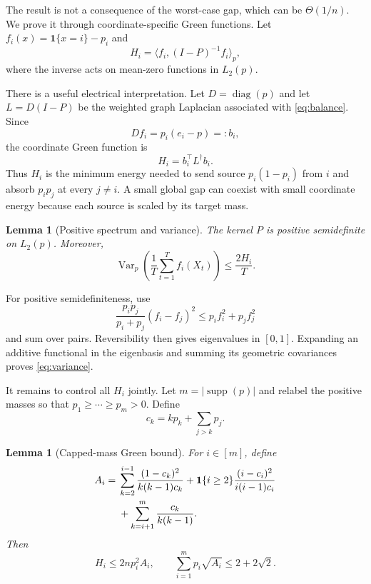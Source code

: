 \documentclass[twoside]{article}
\newtheorem{lemma}[theorem]{Lemma}
\newcommand{\one}{\mathbf 1}
\newcommand{\diag}{\operatorname{diag}}
\newcommand{\supp}{\operatorname{supp}}
\newcommand{\ip}[2]{\langle #1,#2\rangle}
\begin{document}
The result is not a consequence of the worst-case gap, which can be $\Theta(1/n)$. We prove it through coordinate-specific Green functions. Let $f_i(x)=\one\{x=i\}-p_i$ and
\begin{equation}
 H_i=\ip{f_i}{(I-P)^{-1}f_i}_{p},
 \label{eq:green}
\end{equation}
where the inverse acts on mean-zero functions in $L_2(p)$.

There is a useful electrical interpretation. Let $D=\diag(p)$ and let $L=D(I-P)$ be the weighted graph Laplacian associated with \eqref{eq:balance}. Since \[ Df_i=p_i(e_i-p)=:b_i, \] the coordinate Green function is
\begin{equation}
 H_i=b_i^\top L^\dagger b_i.
 \label{eq:electrical}
\end{equation}
Thus $H_i$ is the minimum energy needed to send source $p_i(1-p_i)$ from $i$ and absorb $p_ip_j$ at every $j\ne i$. A small global gap can coexist with small coordinate energy because each source is scaled by its target mass.

\begin{lemma}[Positive spectrum and variance]
\label{lem:variance}
The kernel $P$ is positive semidefinite on $L_2(p)$. Moreover,
\begin{equation}
 \operatorname{Var}_p\!\left(\frac1T\sum_{t=1}^Tf_i(X_t)\right)
 \le\frac{2H_i}{T}.
 \label{eq:variance}
\end{equation}
\end{lemma}

For positive semidefiniteness, use \[ \frac{p_ip_j}{p_i+p_j}(f_i-f_j)^2 \le p_if_i^2+p_jf_j^2 \] and sum over pairs. Reversibility then gives eigenvalues in $[0,1]$. Expanding an additive functional in the eigenbasis and summing its geometric covariances proves \eqref{eq:variance}.

It remains to control all $H_i$ jointly. Let $m=|\supp(p)|$ and relabel the positive masses so that $p_1\ge\cdots\ge p_m>0$. Define
\begin{equation}
 c_k=kp_k+\sum_{j>k}p_j.
 \label{eq:capped}
\end{equation}

\begin{lemma}[Capped-mass Green bound]
\label{lem:profile}
For $i\in[m]$, define
\begin{align}
 A_i={}&\sum_{k=2}^{i-1}\frac{(1-c_k)^2}{k(k-1)c_k}
 +\one\{i\ge2\}\frac{(i-c_i)^2}{i(i-1)c_i}\notag\\
 &+\sum_{k=i+1}^{m}\frac{c_k}{k(k-1)}.
 \label{eq:Ai}
\end{align}
Then
\begin{equation}
 H_i\le2np_i^2A_i,
 \qquad
 \sum_{i=1}^{m}p_i\sqrt{A_i}\le2+2\sqrt2.
 \label{eq:profile}
\end{equation}
\end{lemma}
\end{document}
